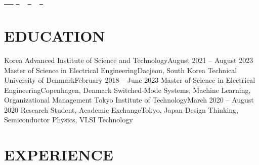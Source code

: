 \documentclass[11pt,hidelinks]{article}
\begin{document}

\begin{center}
    {\Huge \scshape \name} \\ %
    \location \\ \vspace{1pt}
    \small \href{tel:\tel}{ \raisebox{-0.1\height}\faPhone\ \underline{\tel} ~} \href{mailto:\email}{\raisebox{-0.2\height}\faEnvelope\  \underline{\email}} ~ 
    \href{\linkedin}{\raisebox{-0.2\height}\faLinkedin\ \underline{\linkedin}}  ~
    \href{github.com/\github}{\raisebox{-0.2\height}\faGithub\ \underline{\github}} ~
    \vspace{-8pt}
\end{center}

\section{EDUCATION}
  \resumeSubHeadingListStart
    \resumeSubheadingEdu
      {Korea Advanced Institute of Science and Technology}{August 2021 -- August 2023}
      {Master of Science in Electrical Engineering}{Daejeon, South Korea}{}
  \resumeSubHeadingListEnd
  \vspace{-15pt}
    \resumeSubHeadingListStart
   \resumeSubheadingEdu
     {Technical University of Denmark}{February 2018 -- June 2023}
     {Master of Science in Electrical Engineering}{Copenhagen, Denmark}
      {Switched-Mode Systems, Machine Learning, Organizational Management}
  \resumeSubHeadingListEnd
\vspace{-15pt}
  \resumeSubHeadingListStart
    \resumeSubheadingEdu
      {Tokyo Institute of Technology}{March 2020 -- August 2020}
      {Research Student, Academic Exchange}{Tokyo, Japan}
      {Design Thinking, Semiconductor Physics, VLSI Technology}
  \resumeSubHeadingListEnd
  \vspace{-15pt}

\section{EXPERIENCE}
  \resumeSubHeadingListStart
\end{document}
